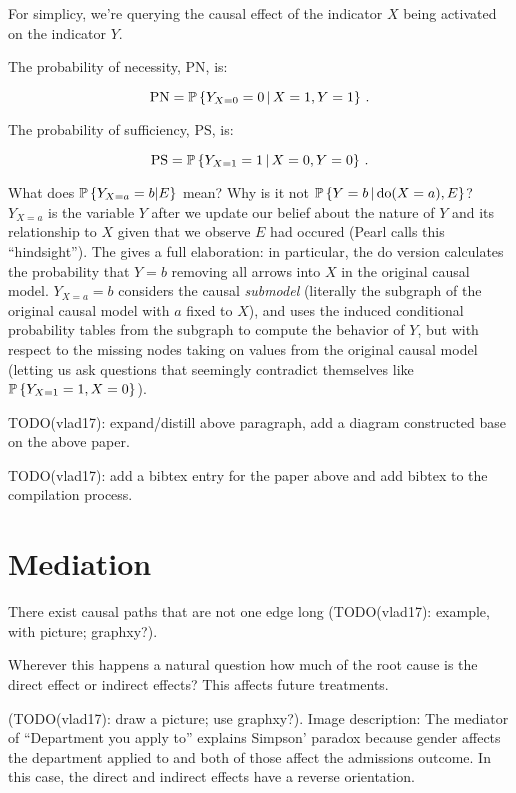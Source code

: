 \documentclass{article}
\begin{document}
For simplicy, we're querying the causal effect of the indicator $X$ being activated on the indicator $Y$.

The probability of necessity, $\textrm{PN}$, is:

$$
\textrm{PN}=\operatorname{\mathbb{P}}\left\{ Y_{X=0}=0 \,\middle|\, X=1,Y=1 \right\}\,.
$$

The probability of sufficiency, $\textrm{PS}$, is:

$$
\textrm{PS}=\operatorname{\mathbb{P}}\left\{ Y_{X=1}=1 \,\middle|\, X=0,Y=0 \right\}\,.
$$

What does $\operatorname{\mathbb{P}}\left\{{Y_{X=a}=b|E}\right\}$ mean? Why is it not $\operatorname{\mathbb{P}}\left\{ Y=b \,\middle|\, \mathrm{do}(X=a), E \right\}$? $Y_{X=a}$ is the variable $Y$ after we update our belief about the nature of $Y$ and its relationship to $X$ given that we observe $E$ had occured (Pearl calls this ``hindsight''). The  gives a full elaboration: in particular, the $\mathrm{do}$ version calculates the probability that $Y=b$ removing all arrows into $X$ in the original causal model. $Y_{X=a}=b$ considers the causal \textit{submodel} (literally the subgraph of the original causal model with $a$ fixed to $X$), and uses the induced conditional probability tables from the subgraph to compute the behavior of $Y$, but with respect to the missing nodes taking on values from the original causal model (letting us ask questions that seemingly contradict themselves like $\operatorname{\mathbb{P}}\left\{{Y_{X=1}=1, X=0}\right\}$).

TODO(vlad17): expand/distill above paragraph, add a diagram constructed base on the above paper.

TODO(vlad17): add a bibtex entry for the paper above and add bibtex to the compilation process.

\section{Mediation}

There exist causal paths that are not one edge long (TODO(vlad17): example, with picture; graphxy?).

Wherever this happens a natural question how much of the root cause is the direct effect or indirect effects? This affects future treatments.

(TODO(vlad17): draw a picture; use graphxy?). Image description: The mediator of ``Department you apply to'' explains Simpson' paradox because gender affects the department applied to and both of those affect the admissions outcome. In this case, the direct and indirect effects have a reverse orientation.
\end{document}
